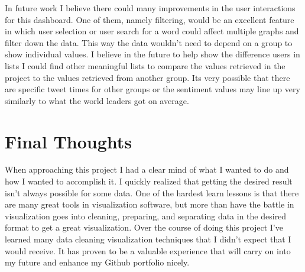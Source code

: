 \documentclass[journal]{vgtc}                %
\begin{document}
In future work I believe there could many improvements in the user interactions for this dashboard.
One of them, namely filtering, would be an excellent feature in which user selection or user search for a word could affect multiple graphs and filter down the data.
This way the data wouldn't need to depend on a group to show individual values.
I believe in the future to help show the difference users in lists I could find other meaningful lists to compare the values retrieved in the project to the values retrieved from another group.
Its very possible that there are specific tweet times for other groups or the sentiment values may line up very similarly to what the world leaders got on average. 

\section*{Final Thoughts}

When approaching this project I had a clear mind of what I wanted to do and how I wanted to accomplish it.
I quickly realized that getting the desired result isn't always possible for some data.
One of the hardest learn lessons is that there are many great tools in visualization software, but more than have the battle in visualization goes into cleaning, preparing, and separating data in the desired format to get a great visualization.
Over the course of doing this project I've learned many data cleaning visualization techniques that I didn't expect that I would receive.
It has proven to be a valuable experience that will carry on into my future and enhance my Github portfolio nicely.



\end{document}
